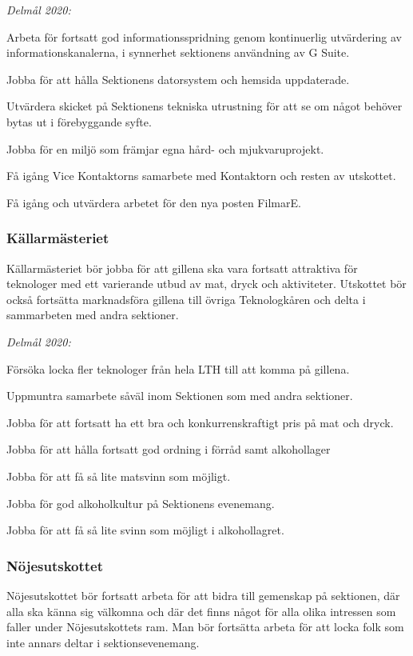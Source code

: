 \documentclass[10pt]{article}
\begin{document}
    \emph{Delmål 2020:}
    \begin{dashlist}
        \item Arbeta för fortsatt god informationsspridning genom kontinuerlig utvärdering av informationskanalerna, i synnerhet sektionens användning av G Suite. 
        \item Jobba för att hålla Sektionens datorsystem och hemsida uppdaterade.
        \item Utvärdera skicket på Sektionens tekniska utrustning för att se om något behöver bytas ut i förebyggande syfte.
        \item Jobba för en miljö som främjar egna hård- och mjukvaruprojekt. 
        \item Få igång Vice Kontaktorns samarbete med Kontaktorn och resten av utskottet.
        \item Få igång och utvärdera arbetet för den nya posten FilmarE.
    \end{dashlist}
    
    \subsubsection*{Källarmästeriet}
    Källarmästeriet bör jobba för att gillena ska vara fortsatt attraktiva för teknologer med ett varierande utbud av mat, dryck och aktiviteter. Utskottet bör också fortsätta marknadsföra gillena till övriga Teknologkåren och delta i sammarbeten med andra sektioner.
    
    \emph{Delmål 2020:}
    \begin{dashlist}
        \item Försöka locka fler teknologer från hela LTH till att komma på gillena.
        \item Uppmuntra samarbete såväl inom Sektionen som med andra sektioner.
        \item Jobba för att fortsatt ha ett bra och konkurrenskraftigt pris på mat och dryck.
        \item Jobba för att hålla fortsatt god ordning i förråd samt alkohollager
        \item Jobba för att få så lite matsvinn som möjligt.
        \item Jobba för god alkoholkultur på Sektionens evenemang.
        \item Jobba för att få så lite svinn som möjligt i alkohollagret.
    \end{dashlist}
    \newpage
    \subsubsection*{Nöjesutskottet}
    Nöjesutskottet bör fortsatt arbeta för att bidra till gemenskap på sektionen, där alla ska känna sig välkomna och där det finns något för alla olika intressen som faller under Nöjesutskottets ram. Man bör fortsätta arbeta för att locka folk som inte annars deltar i sektionsevenemang. 
    
\end{document}
